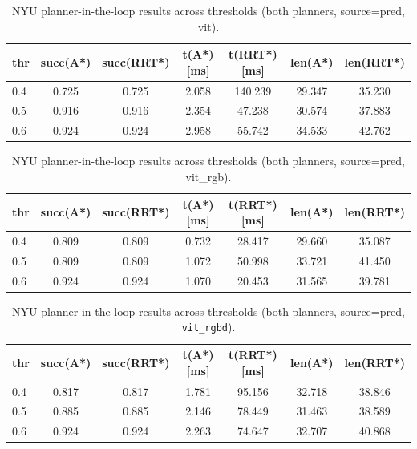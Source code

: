 

\begin{table}[H]
  \centering
  \caption{NYU planner-in-the-loop results across thresholds (both planners, source=pred, vit).}
  \label{tab:nyu_planner_pred_vit}
  \begin{tabular}{lcccccc}
    \toprule
    thr & succ(A*) & succ(RRT*) & t(A*) [ms] & t(RRT*) [ms] & len(A*) & len(RRT*) \\ 
    \midrule
    0.4 & 0.725 & 0.725 & 2.058 & 140.239 & 29.347 & 35.230 \\
    0.5 & 0.916 & 0.916 & 2.354 & 47.238 & 30.574 & 37.883 \\
    0.6 & 0.924 & 0.924 & 2.958 & 55.742 & 34.533 & 42.762 \\
    \bottomrule
  \end{tabular}
\end{table}





\begin{table}[H]
  \centering
  \caption{NYU planner-in-the-loop results across thresholds (both planners, source=pred, vit_rgb).}
  \label{tab:nyu_planner_pred_vit_rgb}
  \begin{tabular}{lcccccc}
    \toprule
    thr & succ(A*) & succ(RRT*) & t(A*) [ms] & t(RRT*) [ms] & len(A*) & len(RRT*) \\ 
    \midrule
    0.4 & 0.809 & 0.809 & 0.732 & 28.417 & 29.660 & 35.087 \\
    0.5 & 0.809 & 0.809 & 1.072 & 50.998 & 33.721 & 41.450 \\
    0.6 & 0.924 & 0.924 & 1.070 & 20.453 & 31.565 & 39.781 \\
    \bottomrule
  \end{tabular}
\end{table}





\begin{table}[H]
  \centering
  \caption{NYU planner-in-the-loop results across thresholds (both planners, source=pred, \texttt{vit\_rgbd}).}
  \label{tab:nyu_planner_pred_vit_rgbd}
  \begin{tabular}{lcccccc}
    \toprule
    thr & succ(A*) & succ(RRT*) & t(A*) [ms] & t(RRT*) [ms] & len(A*) & len(RRT*) \\ 
    \midrule
    0.4 & 0.817 & 0.817 & 1.781 & 95.156 & 32.718 & 38.846 \\
    0.5 & 0.885 & 0.885 & 2.146 & 78.449 & 31.463 & 38.589 \\
    0.6 & 0.924 & 0.924 & 2.263 & 74.647 & 32.707 & 40.868 \\
    \bottomrule
  \end{tabular}
\end{table}



